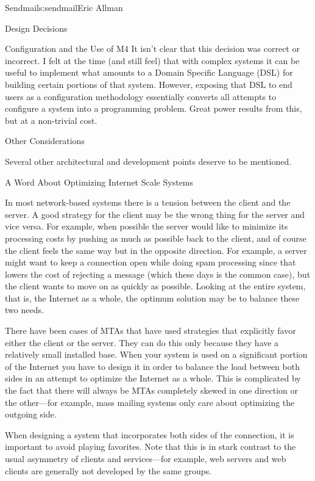 \begin{aosachapter}{Sendmail}{s:sendmail}{Eric Allman}
\begin{aosasect1}{Design Decisions}
\begin{aosasect2}{Configuration and the Use of M4}
It isn't clear that this decision was correct or incorrect.
I felt at the time (and still feel) that with complex systems
it can be useful to implement what amounts to a Domain Specific Language (DSL)
for building certain portions of that system.
However, exposing that DSL to end users as a configuration methodology
essentially converts all attempts to configure a system
into a programming problem.
Great power results from this, but at a non-trivial cost.

\end{aosasect2}

\end{aosasect1}

\begin{aosasect1}{Other Considerations}

Several other architectural and development points deserve to be
mentioned.

\begin{aosasect2}{A Word About Optimizing Internet Scale Systems}

In most network-based systems there is a tension between the client
and the server. A good strategy for the client may be the
wrong thing for the server and vice versa. For example, when possible
the server would like to minimize its processing costs by pushing as
much as possible back to the client, and of course the client feels
the same way but in the opposite direction. For example, a server
might want to keep a connection open while doing spam processing since
that lowers the cost of rejecting a message (which these days is the
common case), but the client wants to move on as quickly as
possible. Looking at the entire system, that is, the Internet as a
whole, the optimum solution may be to balance these two needs.

There have been cases of MTAs that have used strategies that
explicitly favor either the client or the server. They can do this
only because they have a relatively small installed base.  When your
system is used on a significant portion of the Internet you have to
design it in order to balance the load between both sides in an
attempt to optimize the Internet as a whole. This is complicated by
the fact that there will always be MTAs completely skewed in one
direction or the other---for example, mass mailing systems only care
about optimizing the outgoing side.

When designing a system that incorporates both sides of the
connection, it is important to avoid playing favorites. Note that this
is in stark contrast to the usual asymmetry of clients and
services---for example, web servers and web clients are generally not
developed by the same groups.


\end{aosasect2}
\end{aosasect1}
\end{aosachapter}
